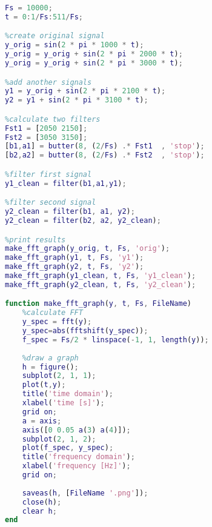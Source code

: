 \documentclass[11pt, a4paper]{article}
\begin{document}
\begin{lstlisting}[language=matlab, frame=single] 
Fs = 10000;
t = 0:1/Fs:511/Fs;

%create original signal
y_orig = sin(2 * pi * 1000 * t); 
y_orig = y_orig + sin(2 * pi * 2000 * t); 
y_orig = y_orig + sin(2 * pi * 3000 * t);

%add another signals
y1 = y_orig + sin(2 * pi * 2100 * t);
y2 = y1 + sin(2 * pi * 3100 * t);

%calculate two filters
Fst1 = [2050 2150];
Fst2 = [3050 3150];
[b1,a1] = butter(8, (2/Fs) .* Fst1  , 'stop'); 
[b2,a2] = butter(8, (2/Fs) .* Fst2  , 'stop'); 

%filter first signal
y1_clean = filter(b1,a1,y1);

%filter second signal
y2_clean = filter(b1, a1, y2);
y2_clean = filter(b2, a2, y2_clean);

%print results
make_fft_graph(y_orig, t, Fs, 'orig');
make_fft_graph(y1, t, Fs, 'y1');
make_fft_graph(y2, t, Fs, 'y2');
make_fft_graph(y1_clean, t, Fs, 'y1_clean');
make_fft_graph(y2_clean, t, Fs, 'y2_clean');

function make_fft_graph(y, t, Fs, FileName)
    %calculate FFT
    y_spec = fft(y);
    y_spec=abs(fftshift(y_spec));
    f_spec = Fs/2 * linspace(-1, 1, length(y));
    
    %draw a graph
    h = figure();
    subplot(2, 1, 1);
    plot(t,y);
    title('time domain');
    xlabel('time [s]');
    grid on;
    a = axis;
    axis([0 0.05 a(3) a(4)]);
    subplot(2, 1, 2);
    plot(f_spec, y_spec);
    title('frequency domain');
    xlabel('frequency [Hz]');
    grid on;
    
    saveas(h, [FileName '.png']);
    close(h);
    clear h;
end
\end{lstlisting}
\end{document}
